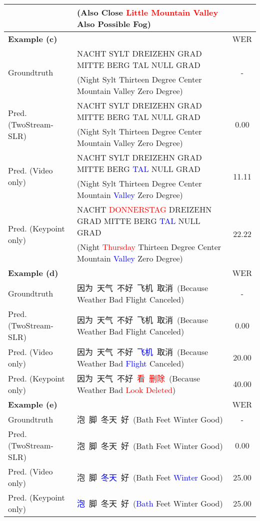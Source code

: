 \documentclass{article}
\newcommand{\sub}[1]{\textcolor{red}{#1}}
\newcommand{\del}[1]{\textcolor{blue}{#1}}
\begin{document}
\begin{CJK*}{UTF8}{gbsn}
\begin{table}[ht!]
{\begin{tabular}{l|l|c}
& (Also Close \sub{Little} \sub{Mountain} \sub{Valley} Also Possible Fog) & \\ 
\midrule
\midrule
\textbf{Example (c)} & & WER \\
\midrule
\multirow{2}{*}{Groundtruth} & NACHT SYLT DREIZEHN GRAD MITTE BERG TAL NULL GRAD & \multirow{2}{*}{-}\\
& (Night Sylt Thirteen Degree Center Mountain Valley Zero Degree) & \\
\midrule
\multirow{2}{*}{Pred. (TwoStream-SLR)} & NACHT SYLT DREIZEHN GRAD MITTE BERG TAL NULL GRAD & \multirow{2}{*}{0.00} \\
& (Night Sylt Thirteen Degree Center Mountain Valley Zero Degree) & \\
\midrule
\multirow{2}{*}{Pred. (Video only)} & NACHT SYLT DREIZEHN GRAD MITTE BERG \del{TAL} NULL GRAD & \multirow{2}{*}{11.11} \\
& (Night Sylt Thirteen Degree Center Mountain \del{Valley} Zero Degree) & \\
\midrule
\multirow{2}{*}{Pred. (Keypoint only)} & NACHT \sub{DONNERSTAG} DREIZEHN GRAD MITTE BERG \del{TAL} NULL GRAD & \multirow{2}{*}{22.22} \\
& (Night \sub{Thursday} Thirteen Degree Center Mountain \del{Valley} Zero Degree) & \\
\midrule
\midrule
\textbf{Example (d)} & & WER \\
\midrule
Groundtruth & 因为\ 天气\ 不好\ 飞机\ 取消\ (Because Weather Bad Flight Canceled) & -\\
\midrule
Pred. (TwoStream-SLR) & 因为\ 天气\ 不好\ 飞机\ 取消\ (Because Weather Bad Flight Canceled) & 0.00 \\
\midrule
Pred. (Video only) & 因为\ 天气\ 不好\ \del{飞机}\ 取消\ (Because Weather Bad \del{Flight} Canceled) & 20.00 \\
\midrule
Pred. (Keypoint only) & 因为\ 天气\ 不好\ \sub{看}\ \sub{删除}\ (Because Weather Bad \sub{Look} \sub{Deleted}) & 40.00\\
\midrule
\midrule
\textbf{Example (e)} & & WER \\
\midrule
Groundtruth & 泡\ 脚\ 冬天\ 好\ (Bath Feet Winter Good) & -\\
\midrule
Pred. (TwoStream-SLR) & 泡\ 脚\ 冬天\ 好\ (Bath Feet Winter Good) & 0.00 \\
\midrule
Pred. (Video only) & 泡\ 脚\ \del{冬天}\ 好\ (Bath Feet \del{Winter} Good) & 25.00\\
\midrule
Pred. (Keypoint only) & \del{泡}\ 脚\ 冬天\ 好\ (\del{Bath} Feet Winter Good) & 25.00\\

\end{tabular}}
\end{table}
\end{CJK*}
\end{document}
